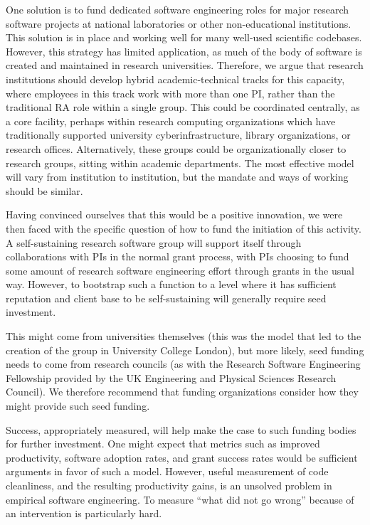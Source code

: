 One solution is to fund dedicated software engineering roles for major research
software projects at national laboratories or other non-educational
institutions. This solution is in place and working well for many well-used
scientific codebases. However, this strategy has limited application, as much of
the body of software is created and maintained in research universities.
Therefore, we argue that research institutions should develop hybrid
academic-technical tracks for this capacity, where employees in this track work
with more than one PI, rather than the traditional RA role within a single
group. This could be coordinated centrally, as a core facility, perhaps within
research computing organizations which have traditionally supported university
cyberinfrastructure, library organizations, or research offices. Alternatively,
these groups could be organizationally closer to research groups, sitting within
academic departments. The most effective model will vary from institution to
institution, but the mandate and ways of working should be similar.

Having convinced ourselves that this would be a positive innovation, we were
then faced with the specific question of how to fund the initiation of this
activity. A self-sustaining research software group will support itself through
collaborations with PIs in the normal grant process, with PIs choosing to fund
some amount of research software engineering effort through grants in the usual
way. However, to bootstrap such a function to a level where it has sufficient
reputation and client base to be self-sustaining will generally require seed
investment.

This might come from universities themselves (this was the model that led to the
creation of the group in University College London), but more likely, seed
funding needs to come from research councils (as with the Research Software
Engineering Fellowship provided by the UK Engineering and Physical Sciences
Research Council). We therefore recommend that funding organizations consider
how they might provide such seed funding.

Success, appropriately measured, will help make the case to such funding bodies
for further investment. One might expect that metrics such as improved
productivity, software adoption rates, and grant success rates would be
sufficient arguments in favor of such a model. However, useful measurement of
code cleanliness, and the resulting productivity gains, is an unsolved problem
in empirical software engineering. To measure ``what did not go wrong'' because
of an intervention is particularly hard.

